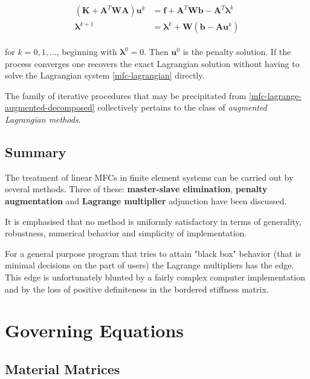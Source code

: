 \documentclass[10pt,b5paper,titlepage]{book}
\newcommand{\m}{\mathbf}
\newcommand{\M}{\pmb}
\newenvironment{eqarray}
{
    \begin{eqnarray}
        \begin{aligned}
}
{
        \end{aligned}
    \end{eqnarray}
}
\begin{document}
\begin{eqarray}\label{mfc-lagrange-augmented-iteration}
    \left( \m{K} + \m{A}^T \m{W} \m{A} \right) \m{u}^k
    &= \m{f} + \m{A}^T \m{W} \m{b} - \m{A}^T \M{\lambda}^k \\
    \M{\lambda}^{k+1} &= \M{\lambda}^k + \m{W} \left(\m{b} - \m{A} \m{u}^k \right)
\end{eqarray}

for $ k = 0, 1, \dots $, beginning with $ \M{\lambda}^0 = 0 $. Then $ \m{u}^0 $
is the penalty solution. If the process converges one recovers the exact Lagrangian
solution without having to solve the Lagrangian system \eqref{mfc-lagrangian}
directly.

The family of iterative procedures that may be precipitated from
\eqref{mfc-lagrange-augmented-decomposed} collectively pertains to the class of
\textit{augmented Lagrangian methods}.


\section{Summary}

The treatment of linear MFCs in finite element systems can be carried out by
several methods. Three of these: \textbf{master-slave elimination},
\textbf{penalty augmentation} and \textbf{Lagrange multiplier} adjunction
have been discussed.

It is emphasised that no method is uniformly satisfactory in terms of generality,
robustness, numerical behavior and simplicity of implementation.

For a general purpose program that tries to attain "black box" behavior
(that is minimal decisions on the part of users) the Lagrange multipliers has
the edge. This edge is unfortunately blunted by a fairly complex computer
implementation and by the loss of positive definiteness in the bordered stiffness
matrix.




\newpage
\chapter{Governing Equations}

\section{Material Matrices}
\end{document}
